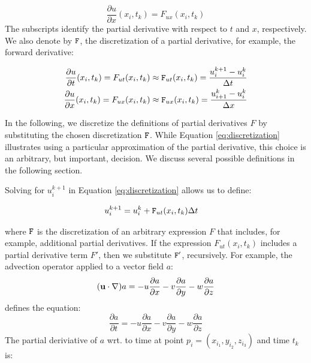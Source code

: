 \documentclass{article}
\begin{document}
\begin{equation}\label{eq:first_deriv_space}
    \dfrac{\partial u}{\partial x}(x_i, t_k) = F_{ux}(x_i,t_k) %
\end{equation}
\noindent The subscripts identify the partial derivative with respect to $t$ and
$x$, respectively.  We also denote by ${\tt F}$, the discretization of a partial
derivative, for example, the forward derivative:


\begin{equation} \label{eq:discretization}
    \begin{split}
        \dfrac{\partial u}{\partial t}(x_i, t_k)=F_{ut}(x_i,t_k) \approx {\tt F}_{ut}(x_i,t_k) = \dfrac{u_i^{k+1}-u_i^k}{\Delta t}\\
        \dfrac{\partial u}{\partial x}(x_i, t_k) = F_{ux}(x_i,t_k)\approx {\tt F}_{ux}(x_i,t_k) = \dfrac{u_{i+1}^k-u_i^k}{\Delta x}
    \end{split}
\end{equation}

\noindent  In the following, we discretize the definitions of partial
derivatives $F$ by substituting the chosen discretization ${\tt F}$. While
Equation \ref{eq:discretization} illustrates using a particular approximation of
the partial derivative, this choice is an arbitrary, but important, decision.
We discuss several possible definitions in the following section.  

Solving for
$u_i^{k+1}$ in Equation \ref{eq:discretization} allows us to define:

\begin{equation} \label{eq:step-update}
    \begin{split}
        u_i^{k+1}& = u_i^k + {\tt F}_{ut}(x_i,t_k)\Delta t
    \end{split}
\end{equation}

\noindent where ${\tt F}$ is the discretization of an arbitrary expression $F$
that includes, for example, additional partial derivatives.  If the expression
$F_{ut}(x_i,t_k)$  includes a partial derivative term $F'$, then we substitute
${\tt F'}$, recursively.  For example,  the advection operator applied to a
vector field $a$: \[({\bf u}\cdot \nabla) a = -u\dfrac{\partial a}{\partial
        x}-v\dfrac{\partial a}{\partial  y}-w\dfrac{\partial a}{\partial  z}\] defines
the equation:
\[\dfrac{\partial a}{\partial t} = - u\dfrac{\partial a}{\partial x} -
    v\dfrac{\partial a}{\partial y} - w\dfrac{\partial a}{\partial z}  \] The
partial deriviative of $a$ wrt. to time at point $p_i = (x_{i_1}, y_{i_2},
    z_{i_3})$ and time $t_k$ is:
\end{document}
